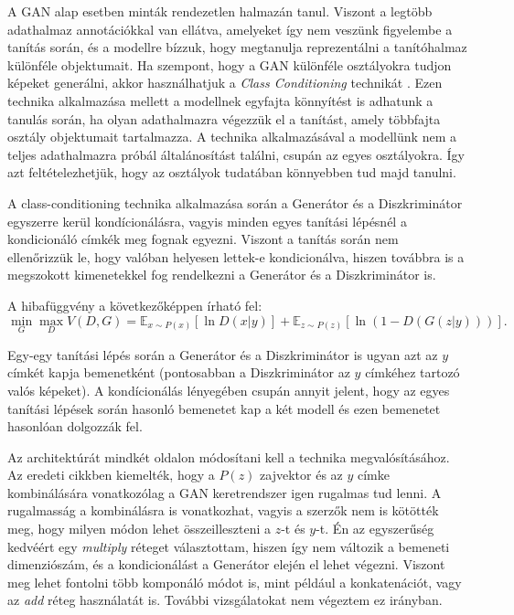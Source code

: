 A GAN alap esetben minták rendezetlen halmazán tanul. Viszont a legtöbb adathalmaz annotációkkal van ellátva, amelyeket így nem veszünk figyelembe a tanítás során, és a modellre bízzuk, hogy megtanulja reprezentálni a tanítóhalmaz különféle objektumait. Ha szempont, hogy a GAN különféle osztályokra tudjon képeket generálni, akkor használhatjuk a \textit{Class Conditioning} technikát \cite{mirza2014conditional}. Ezen technika alkalmazása mellett a modellnek egyfajta könnyítést is adhatunk a tanulás során, ha olyan adathalmazra végezzük el a tanítást, amely többfajta osztály objektumait tartalmazza. A technika alkalmazásával a modellünk nem a teljes adathalmazra próbál általánosítást találni, csupán az egyes osztályokra. Így azt feltételezhetjük, hogy az osztályok tudatában könnyebben tud majd tanulni.

A class-conditioning technika alkalmazása során a Generátor és a Diszkriminátor egyszerre kerül kondícionálásra, vagyis minden egyes tanítási lépésnél a kondicionáló címkék meg fognak egyezni. Viszont a tanítás során nem ellenőrizzük le, hogy valóban helyesen lettek-e kondicionálva, hiszen továbbra is a megszokott kimenetekkel fog rendelkezni a Generátor és a Diszkriminátor is.

A hibafüggvény a következőképpen írható fel:
$$\min_{G}\max_{D}V(D, G) =  \mathbb{E}_{x \sim P(x)} \left[\ln D(x|y) \right] + \mathbb{E}_{z \sim P(z)} \left[\ln(1 - D(G(z|y))) \right].$$

Egy-egy tanítási lépés során a Generátor és a Diszkriminátor is ugyan azt az $y$ címkét kapja bemenetként (pontosabban a Diszkriminátor az $y$ címkéhez tartozó valós képeket). A kondícionálás lényegében csupán annyit jelent, hogy az egyes tanítási lépések során hasonló bemenetet kap a két modell és ezen bemenetet hasonlóan dolgozzák fel.

Az architektúrát mindkét oldalon módosítani kell a technika megvalósításához. Az eredeti cikkben \cite{mirza2014conditional} kiemelték, hogy a $P(z)$ zajvektor és az $y$ címke kombinálására vonatkozólag a GAN keretrendszer igen rugalmas tud lenni. A rugalmasság a kombinálásra is vonatkozhat, vagyis a szerzők nem is kötötték meg, hogy milyen módon lehet összeilleszteni a $z$-t és $y$-t. Én az egyszerűség kedvéért egy \textit{multiply} réteget választottam, hiszen így nem változik a bemeneti dimenziószám, és a kondicionálást a Generátor elején el lehet végezni. Viszont meg lehet fontolni több komponáló módot is, mint például a konkatenációt, vagy az \textit{add} réteg használatát is. További vizsgálatokat nem végeztem ez irányban.

